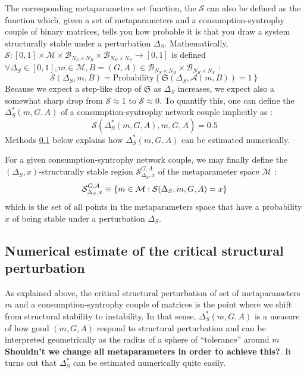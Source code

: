 \documentclass[12pt, titlepage]{report}
\begin{document}
The corresponding metaparameters set function, the  $\mathcal{S}$
can also be defined as the function which, given a set of metaparameters and a consumption-syntrophy couple of binary matrices, tells you how probable it is that you draw a system structurally stable under a perturbation $\Delta_S$. Mathematically, $\mathcal{S} : [0,1] \times \mathcal{M} \times \mathcal{B}_{N_S \times N_R} \times \mathcal{B}_{N_R \times N_S} \rightarrow [0,1]$ is defined $\forall \Delta_S \in [0,1], m \in \mathcal{M}, B=(G,A) \in \mathcal{B}_{N_S \times N_R} \times \mathcal{B}_{N_R \times N_S}$ :
\begin{equation}
\boxed{
\mathcal{S}(\Delta_S, m, B)= \text{Probability}\left\{\mathfrak{S}(\Delta_S, \mathcal{A}(m, B))=1\right\}
}
\end{equation}
Because we expect a step-like drop of $\mathfrak{S}$ as $\Delta_S$ increases, we expect also a somewhat sharp drop from $\mathcal{S} \approx 1$ to $\mathcal{S} \approx 0$. To quantify this, one can define the  $\Delta_S^*(m,G,A)$ of a consumption-syntrophy network couple implicitly as :
\begin{equation}
\mathcal{S}(\Delta_S^*(m, G, A), m, G,A)=0.5
\end{equation}
Methods \ref{sec : structural stability methods numerical estimate critical perturbation} below explains how $\Delta_S^*(m, G,A)$ can be estimated numerically.

For a given consumption-syntrophy network couple, we may finally define the $(\Delta_S,x)$-structurally stable region $\mathcal{S}^{G,A}_{\Delta_S, x}$ of the metaparameter space $\mathcal{M}$ :
\begin{equation}
\mathcal{S}^{G,A}_{\Delta_S, x} \equiv \left\{ m \in \mathcal{M} : \mathcal{S}(\Delta_S, m, G, A)=x \right\}
\end{equation}
which is the set of all points in the metaparameters space that have a probability $x$ of being stable under a perturbation $\Delta_S$.


\subsection{Numerical estimate of the critical structural perturbation}\label{sec : structural stability methods numerical estimate critical perturbation}
As explained above, the critical structural perturbation of set of metaparameters $m$ and a consumption-syntrophy couple of matrices is the point where we shift from structural stability to instability. In that sense, $\Delta_S^*(m, G, A)$ is a measure of how good $(m, G, A)$ respond to structural perturbation and can be interpreted geometrically as the radius of a sphere of ``tolerance'' around $m$ \textbf{Shouldn't we change all metaparameters in order to achieve this?}. It turns out that $\Delta_S^*$ can be estimated numerically quite easily.
\end{document}
